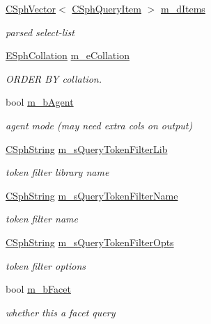 \begin{DoxyCompactItemize}
\hyperlink{classCSphVector}{C\-Sph\-Vector}$<$ \hyperlink{structCSphQueryItem}{C\-Sph\-Query\-Item} $>$ \hyperlink{classCSphQuery_a7d256ea9cf0ed85d7da6111537f02f50}{m\-\_\-d\-Items}
\begin{DoxyCompactList}\small\item\em parsed select-\/list \end{DoxyCompactList}\item 
\hyperlink{sphinxexpr_8h_a78197b7b74319074237ecaf5d99cfbe5}{E\-Sph\-Collation} \hyperlink{classCSphQuery_a58cef95cb041643d36d29e8109aa5ebf}{m\-\_\-e\-Collation}
\begin{DoxyCompactList}\small\item\em O\-R\-D\-E\-R B\-Y collation. \end{DoxyCompactList}\item 
bool \hyperlink{classCSphQuery_ae8159385c051f3d4b46df93488cd0c00}{m\-\_\-b\-Agent}
\begin{DoxyCompactList}\small\item\em agent mode (may need extra cols on output) \end{DoxyCompactList}\item 
\hyperlink{structCSphString}{C\-Sph\-String} \hyperlink{classCSphQuery_a18df87b6e5709334636cdf6ecf987a6e}{m\-\_\-s\-Query\-Token\-Filter\-Lib}
\begin{DoxyCompactList}\small\item\em token filter library name \end{DoxyCompactList}\item 
\hyperlink{structCSphString}{C\-Sph\-String} \hyperlink{classCSphQuery_a5ed04255f875d4b81fae92b06be57114}{m\-\_\-s\-Query\-Token\-Filter\-Name}
\begin{DoxyCompactList}\small\item\em token filter name \end{DoxyCompactList}\item 
\hyperlink{structCSphString}{C\-Sph\-String} \hyperlink{classCSphQuery_afac78b8292278a669085040550823aeb}{m\-\_\-s\-Query\-Token\-Filter\-Opts}
\begin{DoxyCompactList}\small\item\em token filter options \end{DoxyCompactList}\item 
bool \hyperlink{classCSphQuery_abf94cbbcea956dbea12220a1f3b85903}{m\-\_\-b\-Facet}
\begin{DoxyCompactList}\small\item\em whether this a facet query \end{DoxyCompactList}\end{DoxyCompactItemize}


